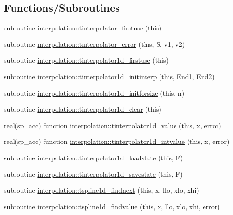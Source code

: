\subsection*{Functions/\+Subroutines}
\begin{DoxyCompactItemize}
\item 
subroutine \mbox{\hyperlink{namespaceinterpolation_a83d34895f7c29f6feb60dee74108123a}{interpolation\+::tinterpolator\+\_\+firstuse}} (this)
\item 
subroutine \mbox{\hyperlink{namespaceinterpolation_a6dbf131728b481585c45c2564ba688b3}{interpolation\+::tinterpolator\+\_\+error}} (this, S, v1, v2)
\item 
subroutine \mbox{\hyperlink{namespaceinterpolation_abbd84288df284345da697e10533c07a7}{interpolation\+::tinterpolator1d\+\_\+firstuse}} (this)
\item 
subroutine \mbox{\hyperlink{namespaceinterpolation_ab07350cec2d065eb2972b8dcabc45545}{interpolation\+::tinterpolator1d\+\_\+initinterp}} (this, End1, End2)
\item 
subroutine \mbox{\hyperlink{namespaceinterpolation_a9c0d111d38654ca08fd15e627d8f8ad3}{interpolation\+::tinterpolator1d\+\_\+initforsize}} (this, n)
\item 
subroutine \mbox{\hyperlink{namespaceinterpolation_a3842ef3937aaef204100599321d0b91f}{interpolation\+::tinterpolator1d\+\_\+clear}} (this)
\item 
real(sp\+\_\+acc) function \mbox{\hyperlink{namespaceinterpolation_a4bc299324720bbb5a8bce547f3f10c2e}{interpolation\+::tinterpolator1d\+\_\+value}} (this, x, error)
\item 
real(sp\+\_\+acc) function \mbox{\hyperlink{namespaceinterpolation_a8b3767144728c4ff1d5564b16b2b2e97}{interpolation\+::tinterpolator1d\+\_\+intvalue}} (this, x, error)
\item 
subroutine \mbox{\hyperlink{namespaceinterpolation_a08169c4a9ace8a6318b3853d0bd9c084}{interpolation\+::tinterpolator1d\+\_\+loadstate}} (this, F)
\item 
subroutine \mbox{\hyperlink{namespaceinterpolation_a2e4b0cd2e1a31f06c7202669b574df13}{interpolation\+::tinterpolator1d\+\_\+savestate}} (this, F)
\item 
subroutine \mbox{\hyperlink{namespaceinterpolation_a54d9bd9ab88b402805329a4dbad1bc3d}{interpolation\+::tspline1d\+\_\+findnext}} (this, x, llo, xlo, xhi)
\item 
subroutine \mbox{\hyperlink{namespaceinterpolation_ac80c6bb26b81ce989cad9b77fcbd66ab}{interpolation\+::tspline1d\+\_\+findvalue}} (this, x, llo, xlo, xhi, error)

\end{DoxyCompactItemize}
